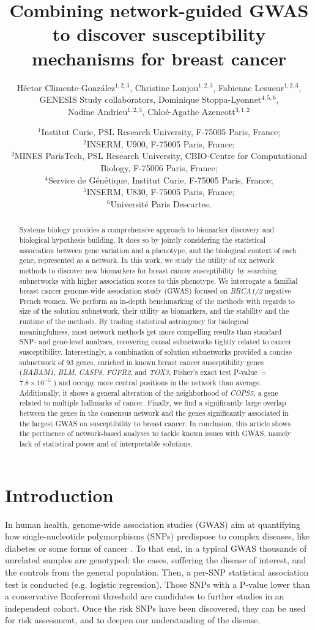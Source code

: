 \documentclass[twocolumn, 11pt]{article}
\title{Combining network-guided GWAS to discover susceptibility mechanisms for breast cancer}
\author{Héctor Climente-González$^{1,2,3}$, Christine Lonjou$^{1,2,3}$, Fabienne Lesueur$^{1,2,3}$, \\
GENESIS Study collaborators, Dominique Stoppa-Lyonnet$^{4,5,6}$, \\
Nadine Andrieu$^{1,2,3}$, Chloé-Agathe Azencott$^{3,1,2}$}
\date{$^{1}$Institut Curie, PSL Research University, F-75005 Paris, France;\\
  $^{2}$INSERM, U900, F-75005 Paris, France;\\
  $^{3}$MINES ParisTech, PSL Research University, CBIO-Centre for Computational Biology, F-75006 Paris, France;\\
  $^{4}$Service de Génétique, Institut Curie, F-75005 Paris, France;\\
  $^{5}$INSERM, U830, F-75005 Paris, France;\\
  $^{6}$Université Paris Descartes.\\
}
\begin{document}
\onecolumn
\maketitle

\begin{abstract}
Systems biology provides a comprehensive approach to biomarker discovery and biological hypothesis building. It does so by jointly considering the statistical association between gene variation and a phenotype, and the biological context of each gene, represented as a network. In this work, we study the utility of six network methods to discover new biomarkers for breast cancer susceptibility by searching subnetworks with higher association scores to this phenotype. We interrogate a familial breast cancer genome-wide association study (GWAS) focused on \emph{BRCA1/2} negative French women. We perform an in-depth benchmarking of the methods with regards to size of the solution subnetwork, their utility as biomarkers, and the stability and the runtime of the methods. By trading statistical astringency for biological meaningfulness, most network methods get more compelling results than standard SNP- and gene-level analyses, recovering causal subnetworks tightly related to cancer susceptibility. Interestingly, a combination of solution subnetworks provided a concise subnetwork of 93 genes, enriched in known breast cancer susceptibility genes (\emph{BABAM1}, \emph{BLM}, \emph{CASP8}, \emph{FGFR2}, and \emph{TOX3}, Fisher's exact test P-value~=~$7.8 \times 10^{-5}$ ) and occupy more central positions in the network than average. Additionally, it shows a general alteration of the neighborhood of \emph{COPS5}, a gene related to multiple hallmarks of cancer. Finally, we find a significantly large overlap between the genes in the consensus network and the genes significantly associated in the largest GWAS on susceptibility to breast cancer. In conclusion, this article shows the pertinence of network-based analyses to tackle known issues with GWAS, namely lack of statistical power and of interpretable solutions.
\end{abstract}

\section{Introduction}

In human health, genome-wide association studies (GWAS) aim at quantifying how single-nucleotide polymorphisms (SNPs) predispose to complex diseases, like diabetes or some forms of cancer \cite{bush_chapter_2012}. To that end, in a typical GWAS thousands of unrelated samples are genotyped: the cases, suffering the disease of interest, and the controls from the general population. Then, a per-SNP statistical association test is conducted (e.g. logistic regression). Those SNPs with a P-value lower than a conservative Bonferroni threshold are candidates to further studies in an independent cohort. Once the risk SNPs have been discovered, they can be used for risk assessment, and to deepen our understanding of the disease.
\end{document}
